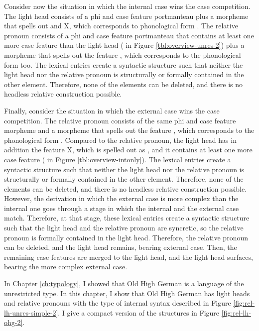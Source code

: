 Consider now the situation in which the internal case wins the case competition. The light head consists of a phi and case feature portmanteau plus a morpheme that spells out  and X, which corresponds to phonological form . The relative pronoun consists of a phi and case feature portmanteau that contains at least one more case feature than the light head ( in Figure \ref{tbl:overview-unres-2}) plus a morpheme that spells out the feature , which corresponds to the phonological form  too.
The lexical entries create a syntactic structure such that neither the light head nor the relative pronoun is structurally or formally contained in the other element. Therefore, none of the elements can be deleted, and there is no headless relative construction possible.

Finally, consider the situation in which the external case wins the case competition. The relative pronoun consists of the same phi and case feature morpheme and a morpheme that spells out the feature , which corresponds to the phonological form . Compared to the relative pronoun, the light head has in addition the feature X, which is spelled out as , and it contains at least one more case feature ( in Figure \ref{tbl:overview-intonly}). The lexical entries create a syntactic structure such that neither the light head nor the relative pronoun is structurally or formally contained in the other element. Therefore, none of the elements can be deleted, and there is no headless relative construction possible.
However, the derivation in which the external case is more complex than the internal one goes through a stage in which the internal and the external case match. Therefore, at that stage, these lexical entries create a syntactic structure such that the light head and the relative pronoun are syncretic, so the relative pronoun is formally contained in the light head. Therefore, the relative pronoun can be deleted, and the light head remains, bearing external case. Then, the remaining case features are merged to the light head, and the light head surfaces, bearing the more complex external case.

In Chapter \ref{ch:typology}, I showed that Old High German is a language of the unrestricted type. In this chapter, I show that Old High German has light heads and relative pronouns with the type of internal syntax described in Figure \ref{fig:rel-lh-unres-simple-2}. I give a compact version of the structures in Figure \ref{fig:rel-lh-ohg-2}.

